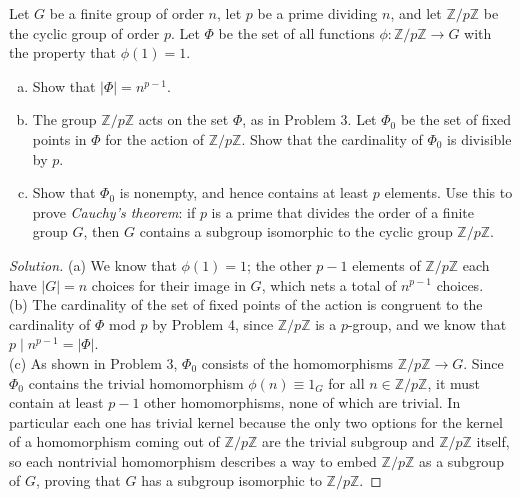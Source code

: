 \documentclass[10pt]{article}
\providecommand{\quiv}{\equiv}
\providecommand{\ZZ}{\mathbb Z}
\providecommand{\ii}{\item}
\newenvironment{soln}{\begin{proof}[Solution]}{\end{proof}}
\providecommand{\abs}[1]{\left|#1\right|}
\begin{document}
\pagebreak

\begin{problem}
    Let $G$ be a finite group of order $n$, let $p$ be a prime dividing $n$,
    and let $\ZZ/p\ZZ$ be the cyclic group of order $p$.
    Let $\Phi$ be the set of all functions $\phi\colon\ZZ/p\ZZ\to G$
    with the property that $\phi(1) = 1$.
    \begin{enumerate}[(a)]
	\ii Show that $\abs{\Phi} = n^{p-1}$.
	\ii The group $\ZZ/p\ZZ$ acts on the set $\Phi$, as in Problem 3.
	Let $\Phi_0$ be the set of fixed points in $\Phi$
	for the action of $\ZZ/p\ZZ$. Show that the cardinality of $\Phi_0$
	is divisible by $p$.
	\ii Show that $\Phi_0$ is nonempty, and hence contains
	at least $p$ elements. Use this to prove \emph{Cauchy's theorem}:
	if $p$ is a prime that divides the order of a finite group $G$,
	then $G$ contains a subgroup isomorphic to the cyclic group $\ZZ/p\ZZ$.
    \end{enumerate}
\end{problem}

\begin{soln}
    (a) We know that $\phi(1) = 1$; the other $p-1$ elements of $\ZZ/p\ZZ$
    each have $\abs G = n$ choices for their image in $G$,
    which nets a total of $n^{p-1}$ choices.\\

    (b) The cardinality of the set of fixed points of the action is congruent
    to the cardinality of $\Phi$ mod $p$ by Problem 4,
    since $\ZZ/p\ZZ$ is a $p$-group, and we know that
    $p\mid n^{p-1} = \abs\Phi$.
    \\

    (c) As shown in Problem 3, $\Phi_0$ consists of the homomorphisms
    $\ZZ/p\ZZ\to G$. Since $\Phi_0$ contains the trivial homomorphism
    $\phi(n)\quiv 1_G$ for all $n\in\ZZ/p\ZZ$, it must contain
    at least $p-1$ other homomorphisms, none of which are trivial.
    In particular each one has trivial kernel because the only two options
    for the kernel of a homomorphism coming out of $\ZZ/p\ZZ$
    are the trivial subgroup and $\ZZ/p\ZZ$ itself, so
    each nontrivial homomorphism describes
    a way to embed $\ZZ/p\ZZ$ as a subgroup of $G$,
    proving that $G$ has a subgroup isomorphic to $\ZZ/p\ZZ$.
\end{soln}
\end{document}
